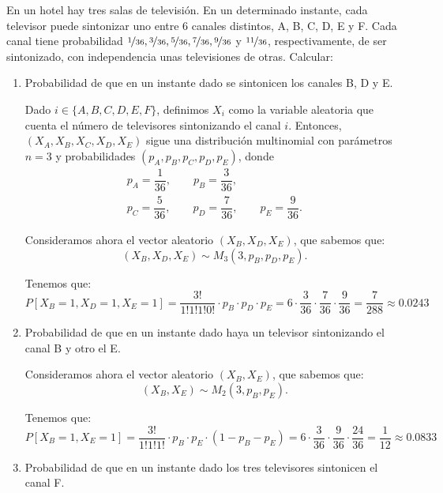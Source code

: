 \begin{ejercicio}
    En un hotel hay tres salas de televisión. En un determinado instante, cada televisor puede sintonizar uno entre 6 canales distintos, A, B, C, D, E y F. Cada canal tiene probabilidad $\nicefrac{1}{36}, \nicefrac{3}{36}, \nicefrac{5}{36}, \nicefrac{7}{36}, \nicefrac{9}{36}$ y $\nicefrac{11}{36}$, respectivamente, de ser sintonizado, con independencia unas televisiones de otras. Calcular:
    \begin{enumerate}
        \item Probabilidad de que en un instante dado se sintonicen los canales B, D y E.
        
        Dado $i\in \{A,B,C,D,E,F\}$, definimos $X_i$ como la variable aleatoria que cuenta el número de televisores sintonizando el canal $i$. Entonces, $(X_A,X_B,X_C,X_D,X_E)$ sigue una distribución multinomial con parámetros $n = 3$ y probabilidades $(p_A,p_B,p_C,p_D,p_E)$, donde
        \begin{gather*}
            p_A = \dfrac{1}{36},\qquad 
            p_B = \dfrac{3}{36},\\
            p_C = \dfrac{5}{36},\qquad 
            p_D = \dfrac{7}{36},\qquad 
            p_E = \dfrac{9}{36}.
        \end{gather*}

        Consideramos ahora el vector aleatorio $(X_B,X_D,X_E)$, que sabemos que:
        \begin{equation*}
            (X_B,X_D,X_E) \sim M_3\left(3,p_B,p_D,p_E\right).
        \end{equation*}

        Tenemos que:
        \begin{equation*}
            P[X_B = 1,X_D = 1,X_E = 1] = \dfrac{3!}{1!1!1!0!}\cdot p_B \cdot p_D \cdot p_E = 6\cdot \dfrac{3}{36}\cdot \dfrac{7}{36}\cdot \dfrac{9}{36} = \dfrac{7}{288} \approx 0.0243
        \end{equation*}

        \item Probabilidad de que en un instante dado haya un televisor sintonizando el canal B y otro el E.
        
        Consideramos ahora el vector aleatorio $(X_B,X_E)$, que sabemos que:
        \begin{equation*}
            (X_B,X_E) \sim M_2\left(3,p_B,p_E\right).
        \end{equation*}

        Tenemos que:
        \begin{equation*}
            P[X_B = 1,X_E = 1] = \dfrac{3!}{1!1!1!}\cdot p_B \cdot p_E \cdot \left(1-p_B-p_E\right) = 6\cdot \dfrac{3}{36}\cdot \dfrac{9}{36}\cdot \dfrac{24}{36} = \dfrac{1}{12} \approx 0.0833
        \end{equation*}
        \item Probabilidad de que en un instante dado los tres televisores sintonicen el canal F.
        

\end{enumerate}
\end{ejercicio}
